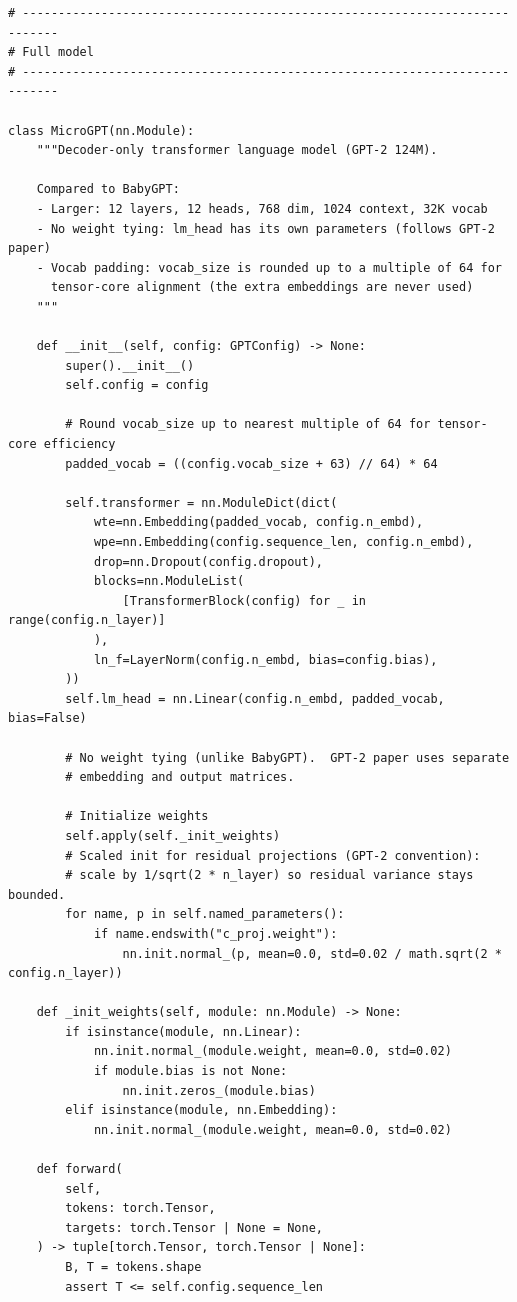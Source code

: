 \begin{lstlisting}
# ---------------------------------------------------------------------------
# Full model
# ---------------------------------------------------------------------------

class MicroGPT(nn.Module):
    """Decoder-only transformer language model (GPT-2 124M).

    Compared to BabyGPT:
    - Larger: 12 layers, 12 heads, 768 dim, 1024 context, 32K vocab
    - No weight tying: lm_head has its own parameters (follows GPT-2 paper)
    - Vocab padding: vocab_size is rounded up to a multiple of 64 for
      tensor-core alignment (the extra embeddings are never used)
    """

    def __init__(self, config: GPTConfig) -> None:
        super().__init__()
        self.config = config

        # Round vocab_size up to nearest multiple of 64 for tensor-core efficiency
        padded_vocab = ((config.vocab_size + 63) // 64) * 64

        self.transformer = nn.ModuleDict(dict(
            wte=nn.Embedding(padded_vocab, config.n_embd),
            wpe=nn.Embedding(config.sequence_len, config.n_embd),
            drop=nn.Dropout(config.dropout),
            blocks=nn.ModuleList(
                [TransformerBlock(config) for _ in range(config.n_layer)]
            ),
            ln_f=LayerNorm(config.n_embd, bias=config.bias),
        ))
        self.lm_head = nn.Linear(config.n_embd, padded_vocab, bias=False)

        # No weight tying (unlike BabyGPT).  GPT-2 paper uses separate
        # embedding and output matrices.

        # Initialize weights
        self.apply(self._init_weights)
        # Scaled init for residual projections (GPT-2 convention):
        # scale by 1/sqrt(2 * n_layer) so residual variance stays bounded.
        for name, p in self.named_parameters():
            if name.endswith("c_proj.weight"):
                nn.init.normal_(p, mean=0.0, std=0.02 / math.sqrt(2 * config.n_layer))

    def _init_weights(self, module: nn.Module) -> None:
        if isinstance(module, nn.Linear):
            nn.init.normal_(module.weight, mean=0.0, std=0.02)
            if module.bias is not None:
                nn.init.zeros_(module.bias)
        elif isinstance(module, nn.Embedding):
            nn.init.normal_(module.weight, mean=0.0, std=0.02)

    def forward(
        self,
        tokens: torch.Tensor,
        targets: torch.Tensor | None = None,
    ) -> tuple[torch.Tensor, torch.Tensor | None]:
        B, T = tokens.shape
        assert T <= self.config.sequence_len


\end{lstlisting}
